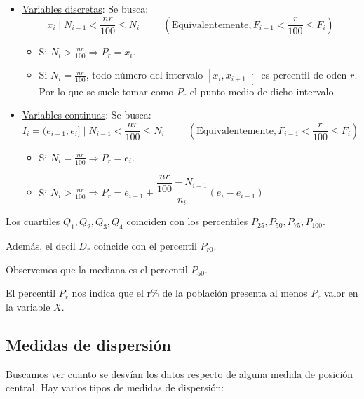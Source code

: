 \begin{itemize}
    \item \underline{Variables discretas}:
          Se busca:
          $$x_i \mid N_{i-1} < \dfrac{nr}{100} \leq N_i \hspace{1cm} \left(\text{Equivalentemente}, F_{i-1}<\dfrac{r}{100} \leq F_i\right)$$

          \begin{itemize}
              \item Si $N_i > \frac{nr}{100} \Rightarrow P_r = x_i$.
              \item Si $N_i = \frac{nr}{100}$, todo número del intervalo $\left[x_i, x_{i+1}\right[$ es percentil de oden $r$. Por lo que se suele
                    tomar como $P_r$ el punto medio de dicho intervalo.
          \end{itemize}

    \item \underline{Variables continuas}:
          Se busca:
          $$I_i = (e_{i-1}, e_i] \mid N_{i-1} < \dfrac{nr}{100} \leq N_i \hspace{1cm} \left(\text{Equivalentemente}, F_{i-1}<\dfrac{r}{100} \leq F_i\right)$$

          \begin{itemize}
              \item Si $N_i = \frac{nr}{100} \Rightarrow P_r = e_i$.
              \item Si $N_i > \frac{nr}{100} \Rightarrow P_r = e_{i-1} + \dfrac{\dfrac{nr}{100} - N_{i-1}}{n_i} (e_i - e_{i-1})$
          \end{itemize}
\end{itemize}


Los cuartiles $Q_1, Q_2, Q_3, Q_4$ coinciden con los percentiles $P_{25}, P_{50}, P_{75}, P_{100}$.

Además, el decil $D_r$ coincide con el percentil $P_{r0}$.

Observemos que la mediana es el percentil $P_{50}$.

El percentil $P_r$ nos indica que el r\% de la población presenta al menos $P_r$ valor en la variable $X$.

\subsection{Medidas de dispersión}
Buscamos ver cuanto se desvían los datos respecto de alguna medida de posición central.
Hay varios tipos de medidas de dispersión:


